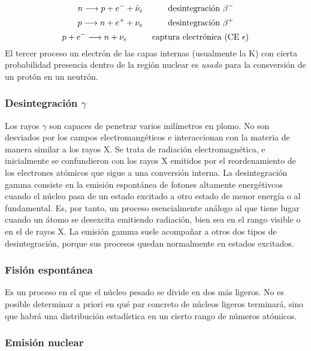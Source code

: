 \begin{equation}
    n \longrightarrow p + e^- + \bar{\nu}_e  \quad \quad \quad \text{desintegración} \ \beta^-
\end{equation}
\begin{equation}
    p \longrightarrow n + e^+ + {\nu}_e \quad \quad \quad \text{desintegración} \ \beta^+
\end{equation}
\begin{equation}
    p + e^- \longrightarrow n + {\nu}_e \quad \quad \quad \text{captura electrónica (CE} \ \epsilon)
\end{equation}
El tercer proceso un electrón de las capas internas (usualmente la K) con cierta probabilidad presencia dentro de la región nuclear es \textit{usado} para la consversión de un protón en un neutrón. 

\subsubsection{Desintegración $\gamma$}

Los rayos $\gamma$ son capaces de penetrar varios milímetros en plomo. No son desviados por los campos electromangéticos e interaccionan con la materia de manera similar a los rayos X. Se trata de radiación electromagnética, e inicialmente se confundieron con los rayos X emitidos por el reordenamiento de los electrones atómicos que sigue a una conversión interna. La desintegración gamma consiste en la emisión espontánea de fotones altamente energétivcos cuando el núcleo pasa de un estado excitado a otro estado de menor energía o al fundamental. Es, por tanto, un proceso esencialmente análogo al que tiene lugar cuando un átomo se desexcita emitiendo radiación, bien sea en el rango visible o en el de rayos X. La emisión gamma suele acompañar a otros dos tipos de desintegración, porque sus procesos quedan normalmente en estados excitados. 

\subsubsection{Fisión espontánea}

Es un proceso  en el que el núcleo pesado se divide en dos más ligeros. No es posible determinar a priori en qué par concreto de núcleos ligeros terminará, sino que habrá una distribución estadística en un cierto rango de números atómicos. 

\subsubsection{Emisión nuclear}

